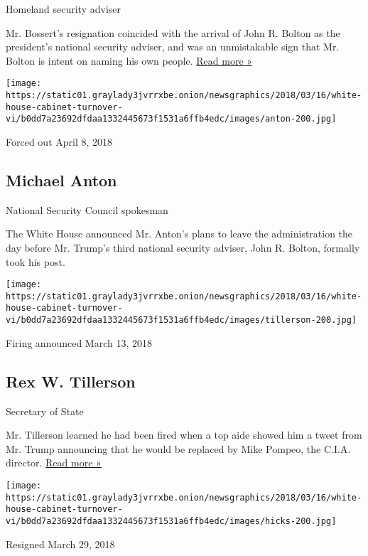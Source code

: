 Homeland security adviser

Mr. Bossert's resignation coincided with the arrival of John R. Bolton
as the president's national security adviser, and was an unmistakable
sign that Mr. Bolton is intent on naming his own people.
\href{https://www.nytimes3xbfgragh.onion/2018/04/10/us/politics/tom-bossert-trump-homeland-security.html?hp\&action=click\&pgtype=Homepage\&clickSource=story-heading\&module=first-column-region\&region=top-news\&WT.nav=top-news}{Read
more »}

\texttt{[image: https://static01.graylady3jvrrxbe.onion/newsgraphics/2018/03/16/white-house-cabinet-turnover-vi/b0dd7a23692dfdaa1332445673f1531a6ffb4edc/images/anton-200.jpg]}

Forced out April 8, 2018

\hypertarget{michael-anton}{%
\subsection{Michael Anton}\label{michael-anton}}

National Security Council spokesman

The White House announced Mr. Anton's plans to leave the administration
the day before Mr. Trump's third national security adviser, John R.
Bolton, formally took his post.

\texttt{[image: https://static01.graylady3jvrrxbe.onion/newsgraphics/2018/03/16/white-house-cabinet-turnover-vi/b0dd7a23692dfdaa1332445673f1531a6ffb4edc/images/tillerson-200.jpg]}

Firing announced March 13, 2018

\hypertarget{rex-w-tillerson}{%
\subsection{Rex W. Tillerson}\label{rex-w-tillerson}}

Secretary of State

Mr. Tillerson learned he had been fired when a top aide showed him a
tweet from Mr. Trump announcing that he would be replaced by Mike
Pompeo, the C.I.A. director.
\href{https://www.nytimes3xbfgragh.onion/2018/03/13/us/politics/trump-tillerson-pompeo.html}{Read
more »}

\texttt{[image: https://static01.graylady3jvrrxbe.onion/newsgraphics/2018/03/16/white-house-cabinet-turnover-vi/b0dd7a23692dfdaa1332445673f1531a6ffb4edc/images/hicks-200.jpg]}

Resigned March 29, 2018

